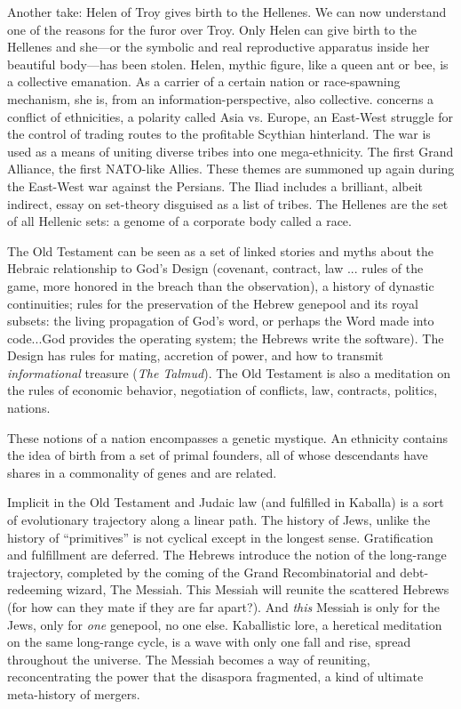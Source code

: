 Another take: Helen of Troy gives birth to the Hellenes. We can now understand one of the reasons for the furor over Troy. Only Helen can give birth to the Hellenes and she---or the symbolic and real reproductive apparatus inside her beautiful body---has been stolen. Helen, mythic figure, like a queen ant or bee, is a collective emanation. As a carrier of a certain nation or race-spawning mechanism, she is, from an information-perspective, also collective.  concerns a conflict of ethnicities, a polarity called Asia vs. Europe, an East-West struggle for the control of trading routes to the profitable Scythian hinterland. The war is used as a means of uniting diverse tribes into one mega-ethnicity. The first Grand Alliance, the first NATO-like Allies. These themes are summoned up again during the East-West war against the Persians. The Iliad includes a brilliant, albeit indirect, essay on set-theory disguised as a list of tribes. The Hellenes are the set of all Hellenic sets: a genome of a corporate body called a race.

The Old Testament can be seen as a set of linked stories and myths about the Hebraic relationship to God's Design (covenant, contract, law ... rules of the game, more honored in the breach than the observation), a history of dynastic continuities; rules for the preservation of the Hebrew genepool and its royal subsets: the living propagation of God's word, or perhaps the Word made into code...God provides the operating system; the Hebrews write the software). The Design has rules for mating, accretion of power, and how to transmit \emph{informational} treasure (\emph{The Talmud}). The Old Testament is also a meditation on the rules of economic behavior, negotiation of conflicts, law, contracts, politics, nations.

These notions of a nation encompasses a genetic mystique. An ethnicity contains the idea of birth from a set of primal founders, all of whose descendants have shares in a commonality of genes and are related.

Implicit in the Old Testament and Judaic law (and fulfilled in Kaballa) is a sort of evolutionary trajectory along a linear path. The history of Jews, unlike the history of \enquote{primitives} is not cyclical except in the longest sense. Gratification and fulfillment are deferred. The Hebrews introduce the notion of the long-range trajectory, completed by the coming of the Grand Recombinatorial and debt-redeeming wizard, The Messiah. This Messiah will reunite the scattered Hebrews (for how can they mate if they are far apart?). And \emph{this} Messiah is only for the Jews, only for \emph{one} genepool, no one else. Kaballistic lore, a heretical meditation on the same long-range cycle, is a wave with only one fall and rise, spread throughout the universe. The Messiah becomes a way of reuniting, reconcentrating the power that the disaspora fragmented, a kind of ultimate meta-history of mergers.

